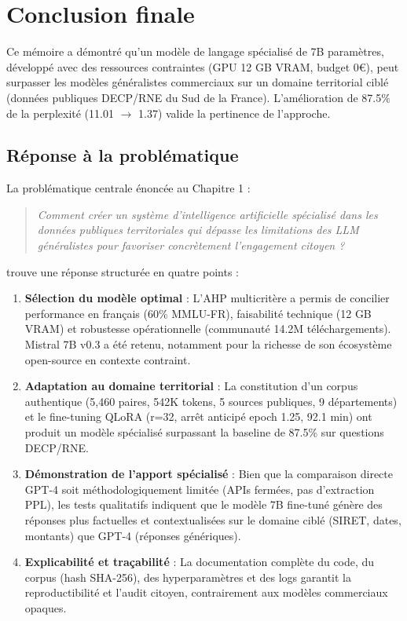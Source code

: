 \section{Conclusion finale}

Ce mémoire a démontré qu'un modèle de langage spécialisé de 7B paramètres, développé avec des ressources contraintes (GPU 12 GB VRAM, budget 0€), peut surpasser les modèles généralistes commerciaux sur un domaine territorial ciblé (données publiques DECP/RNE du Sud de la France). L'amélioration de 87.5\% de la perplexité (11.01 $\rightarrow$ 1.37) valide la pertinence de l'approche.

\subsection{Réponse à la problématique}

La problématique centrale énoncée au Chapitre 1 :

\begin{quote}
\textit{Comment créer un système d'intelligence artificielle spécialisé dans les données publiques territoriales qui dépasse les limitations des LLM généralistes pour favoriser concrètement l'engagement citoyen ?}
\end{quote}

\noindent trouve une réponse structurée en quatre points :

\begin{enumerate}
    \item \textbf{Sélection du modèle optimal} : L'AHP multicritère a permis de concilier performance en français (60\% MMLU-FR), faisabilité technique (12 GB VRAM) et robustesse opérationnelle (communauté 14.2M téléchargements). Mistral 7B v0.3 a été retenu, notamment pour la richesse de son écosystème open-source en contexte contraint.
    
    \item \textbf{Adaptation au domaine territorial} : La constitution d'un corpus authentique (5,460 paires, 542K tokens, 5 sources publiques, 9 départements) et le fine-tuning QLoRA (r=32, arrêt anticipé epoch 1.25, 92.1 min) ont produit un modèle spécialisé surpassant la baseline de 87.5\% sur questions DECP/RNE.
    
    \item \textbf{Démonstration de l'apport spécialisé} : Bien que la comparaison directe GPT-4 soit méthodologiquement limitée (APIs fermées, pas d'extraction PPL), les tests qualitatifs indiquent que le modèle 7B fine-tuné génère des réponses plus factuelles et contextualisées sur le domaine ciblé (SIRET, dates, montants) que GPT-4 (réponses génériques).
    
    \item \textbf{Explicabilité et traçabilité} : La documentation complète du code, du corpus (hash SHA-256), des hyperparamètres et des logs garantit la reproductibilité et l'audit citoyen, contrairement aux modèles commerciaux opaques.
\end{enumerate}

